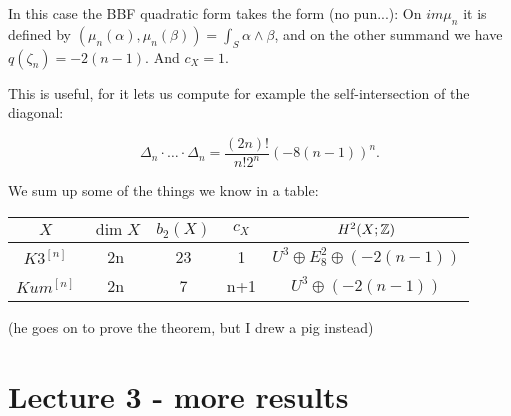 \documentclass[11pt, english]{article}
\begin{document}
In this case the BBF quadratic form takes the form (no pun...): On $im \mu_n$ it is defined by $(\mu_n(\alpha),\mu_n(\beta)) = \int_S \alpha \wedge \beta$, and on the other summand we have $q(\zeta_n) = -2(n-1)$. And $c_X = 1$. 

This is useful, for it lets us compute for example the self-intersection of the diagonal:

$$
\Delta_n \cdot \ldots \cdot \Delta_n = \frac{(2n)!}{n! 2^n} (-8(n-1))^n.
$$

We sum up some of the things we know in a table:
\begin{center}
\begin{tabular}{c | c | c | c | c}
$X$ & $\dim X$ & $b_2(X)$ & $c_X$ & $H^2(X; \mathbb{Z})$ \\
\hline 
$K3^{[n]}$ & 2n & 23 & 1 & $U^3 \oplus E_8^2 \oplus (-2(n-1))$ \\
$Kum^{[n]}$ & 2n & 7 & n+1 & $U^3 \oplus (-2(n-1))$ 
\end{tabular}
\end{center}

(he goes on to prove the theorem, but I drew a pig instead)

\section{Lecture 3 - more results}
\end{document}
